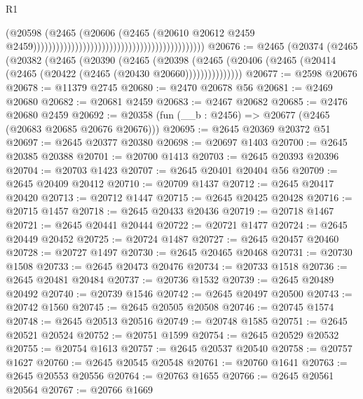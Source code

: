 \begin{lexlean}{R1}
\begin{coremodule}
                                                                                    (@20598
                                                                                      (@2465
                                                                                        (@20606
                                                                                          (@2465
                                                                                            (@20610
                                                                                              @20612
                                                                                              @2459
                                                                                              @2459)))))))))))))))))))))))))))))))))))))))))))))
@20676 := @2465
    (@20374
      (@2465
        (@20382
          (@2465
            (@20390
              (@2465
                (@20398
                  (@2465 (@20406 (@2465 (@20414 (@2465 (@20422 (@2465 (@20430 @20660)))))))))))))))
@20677 := @2598 @20676
@20678 := @11379 @2745
@20680 := @2470 @20678 @56
@20681 := @2469 @20680
@20682 := @20681 @2459
@20683 := @2467 @20682
@20685 := @2476 @20680 @2459
@20692 := @20358 (fun (__b : @2456) => @20677 (@2465 (@20683 @20685 @20676 @20676)))
@20695 := @2645 @20369 @20372 @51
@20697 := @2645 @20377 @20380
@20698 := @20697 @1403
@20700 := @2645 @20385 @20388
@20701 := @20700 @1413
@20703 := @2645 @20393 @20396
@20704 := @20703 @1423
@20707 := @2645 @20401 @20404 @56
@20709 := @2645 @20409 @20412
@20710 := @20709 @1437
@20712 := @2645 @20417 @20420
@20713 := @20712 @1447
@20715 := @2645 @20425 @20428
@20716 := @20715 @1457
@20718 := @2645 @20433 @20436
@20719 := @20718 @1467
@20721 := @2645 @20441 @20444
@20722 := @20721 @1477
@20724 := @2645 @20449 @20452
@20725 := @20724 @1487
@20727 := @2645 @20457 @20460
@20728 := @20727 @1497
@20730 := @2645 @20465 @20468
@20731 := @20730 @1508
@20733 := @2645 @20473 @20476
@20734 := @20733 @1518
@20736 := @2645 @20481 @20484
@20737 := @20736 @1532
@20739 := @2645 @20489 @20492
@20740 := @20739 @1546
@20742 := @2645 @20497 @20500
@20743 := @20742 @1560
@20745 := @2645 @20505 @20508
@20746 := @20745 @1574
@20748 := @2645 @20513 @20516
@20749 := @20748 @1585
@20751 := @2645 @20521 @20524
@20752 := @20751 @1599
@20754 := @2645 @20529 @20532
@20755 := @20754 @1613
@20757 := @2645 @20537 @20540
@20758 := @20757 @1627
@20760 := @2645 @20545 @20548
@20761 := @20760 @1641
@20763 := @2645 @20553 @20556
@20764 := @20763 @1655
@20766 := @2645 @20561 @20564
@20767 := @20766 @1669

\end{coremodule}
\end{lexlean}

